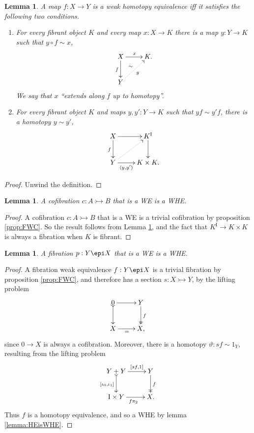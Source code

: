 \documentclass[11pt]{article}
\newcommand{\mono}{\ensuremath{\rightarrowtail}}
\newcommand{\ra}{\ensuremath{\rightarrow}}
\newcommand{\I}{\ensuremath{\mathrm{I}}}
\newtheorem{lemma}[theorem]{Lemma}
\theoremstyle{remark}
\theoremstyle{definition}
\begin{document}
\begin{lemma}\label{lem:WHEunwound}
A map $f : X\ra Y$ is a \emph{weak homotopy equivalence} iff it satisfies the following two conditions.
\begin{enumerate}
\item For every fibrant object $K$ and every map $x : X \ra K$ there is a map $y:Y\ra K$ such that $y\circ f \sim x$,
\[
\xymatrix{
X \ar[d]_{f} \ar[r]^{x}  & K.\\
Y \ar@{..>}[ru]_{y}^{\sim} &
}
\]
We say that $x$ ``extends along $f$ up to homotopy''.
\item For every fibrant object $K$ and maps $y, y' : Y \ra K$ such that $yf \sim y'f$, there is a homotopy $y\sim y'$,
\[
\xymatrix{
X \ar[d]_{f} \ar[r]  & K^\I\ar[d] \\
Y \ar@{..>}[ru] \ar[r]_-{\langle y,y'\rangle} & K\times K.
}
\]
\end{enumerate}
\end{lemma}
\begin{proof}
Unwind the definition.
\end{proof}

\begin{lemma}\label{lemma:CofWEtoWHE}
A cofibration $c : A \mono B$ that is a WE is a WHE.
\end{lemma}

\begin{proof}
A cofibration $c : A \mono B$ that is a WE is a trivial cofibration by proposition \ref{prop:FWC}. 
So the result follows from Lemma \ref{lem:WHEunwound}, and the fact that $K^\I\ra K\times K$ is always a fibration when $K$ is fibrant.
\end{proof}

\begin{lemma}\label{lemma:FibWEtoWHE}
A fibration $ p : Y \epi X$ that is a WE is a WHE.
\end{lemma}
\begin{proof}
A fibration weak equivalence $f : Y\epi X$ is a trivial fibration by proposition \ref{prop:FWC}, and therefore has a section $s: X\mono Y$, by the lifting problem
\begin{equation*}%
\xymatrix{
0 \ar@{>->}[d]_{} \ar[r] & Y \ar@{>>}[d]^{f} \\
X\ar[r]_{=} & X,
}
\end{equation*}
%
since $0\ra X$ is always a cofibration. Moreover, there is a homotopy $\vartheta : sf \sim 1_Y$, resulting from the lifting problem
\begin{equation*}%
\xymatrix{
Y+Y \ar@{>->}[d]_{[\iota_0, \iota_1]} \ar[r]^-{[sf, 1]}  & Y\ar@{>>}[d]^{f} \\
\I\times Y \ar[r]_{f\pi_2} & X.
}
\end{equation*}
Thus $f$ is a homotopy equivalence, and so a WHE by lemma \ref{lemma:HEisWHE}.
\end{proof}
\end{document}
